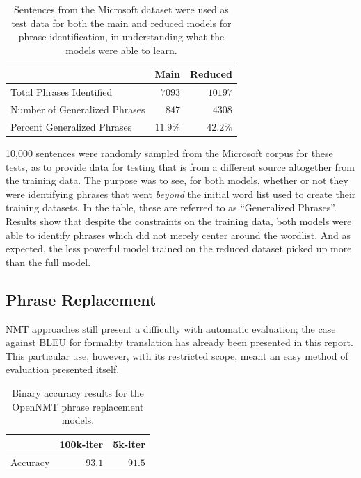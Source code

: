 \begin{table}[h]
\centering
 \begin{tabular}{|| l | r | r ||}
 \hline
  & Main & Reduced \\ [0.3ex] 
 \hline\hline
 Total Phrases Identified & $7093$ & $10197$ \\
 \hline
 Number of Generalized Phrases & $847$ & $4308$ \\
 \hline
 Percent Generalized Phrases & $11.9\%$ & $42.2\%$ \\
 \hline
\end{tabular}
\caption{Sentences from the Microsoft dataset were used as test data for both the main and reduced models for phrase identification, in understanding what the models were able to learn.}
\label{mic-phrase-ident}
\end{table}

10,000 sentences were randomly sampled from the Microsoft corpus for these tests, as to provide data for testing that is from a different source altogether from the training data. The purpose was to see, for both models, whether or not they were identifying phrases that went \textit{beyond} the initial word list used to create their training datasets. In the table, these are referred to as ``Generalized Phrases''. Results show that despite the constraints on the training data, both models were able to identify phrases which did not merely center around the wordlist. And as expected, the less powerful model trained on the reduced dataset picked up more than the full model.

\subsection{Phrase Replacement}

NMT approaches still present a difficulty with automatic evaluation; the case against BLEU for formality translation has already been presented in this report. This particular use, however, with its restricted scope, meant an easy method of evaluation presented itself.

\begin{table}[h]
\centering
 \begin{tabular}{|| l | r | r ||}
 \hline
  & 100k-iter & 5k-iter \\ [0.3ex] 
 \hline\hline
 Accuracy & $93.1$ & $91.5$ \\
 \hline
\end{tabular}
\caption{Binary accuracy results for the OpenNMT phrase replacement models.}
\label{phrase-repl-results}
\end{table}

